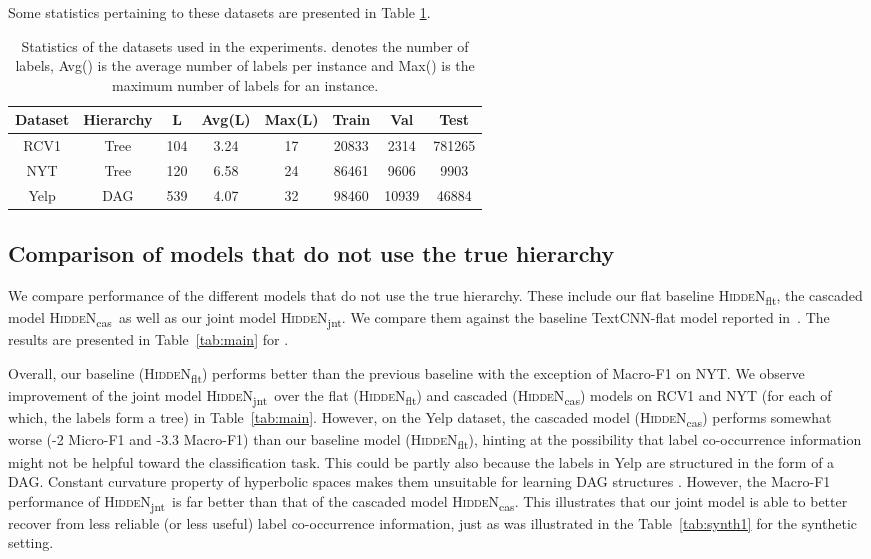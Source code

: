 \documentclass[11pt,a4paper]{article}
\newcommand{\modeljnt}{\mbox{\textsc{HiddeN}\textsubscript{jnt}}}
\newcommand{\modelcas}{\mbox{\textsc{HiddeN}\textsubscript{cas}}}
\newcommand{\modelflt}{\mbox{\textsc{HiddeN}\textsubscript{flt}}}
\begin{document}
Some statistics pertaining to these datasets are presented in Table \ref{tab:data}.

\begin{table}[H]
    \caption{Statistics of the datasets used in the experiments.  denotes the number of labels,  Avg() is the average number of labels per instance and Max() is the maximum number of labels for an instance.}
    \label{tab:data}
    \begin{adjustbox}{max width=0.48\textwidth}
    \begin{tabular}{cccccccc} 
    \toprule
    \textbf{Dataset} & \textbf{Hierarchy} & \textbf{\textbar{}L\textbar{}} & \textbf{Avg(\textbar{}L\textbar{})} & \textbf{Max(\textbar{}L\textbar{})} & \textbf{Train} & \textbf{Val} & \textbf{Test} \\ 
    \hline
    RCV1 & Tree & 104 & 3.24 & 17 & 20833 & 2314 & 781265 \\
    NYT & Tree & 120 & 6.58 & 24 & 86461 & 9606 & 9903 \\
    Yelp & DAG & 539 & 4.07 & 32 & 98460 & 10939 & 46884 \\
    \bottomrule
    \end{tabular}
    \end{adjustbox}
\end{table}

\subsection{Comparison of models that do not use the true hierarchy}
We compare performance of the different models that do not use the true hierarchy. These include our flat baseline \modelflt, the cascaded model \modelcas\ as well as our joint model \modeljnt. We compare them against the baseline TextCNN-flat model reported in~\citet{emnlp}. The results are presented in Table~\ref{tab:main} for .

Overall, our baseline (\modelflt) performs better than the previous baseline with the exception of Macro-F1 on NYT. We observe improvement of the joint model \modeljnt\ over the flat (\modelflt) and cascaded (\modelcas) models on RCV1 and NYT (for each of which, the labels form a tree) in Table~\ref{tab:main}. However, on the Yelp dataset, the cascaded model (\modelcas) performs somewhat worse (-2 Micro-F1 and -3.3 Macro-F1) than our baseline model (\modelflt), hinting at the possibility that label co-occurrence information might not be helpful toward the classification task. This could be partly also because the labels in Yelp are structured in the form of a DAG. Constant curvature property of hyperbolic spaces makes them unsuitable for learning DAG structures \cite{li2018smoothing}. However, the Macro-F1 performance of \modeljnt\ is far better than that of the cascaded model \modelcas. This illustrates that our joint model is able to better recover from less reliable (or less useful) label co-occurrence information, just as was illustrated in the Table~\ref{tab:synth1} for the synthetic setting.
\end{document}
